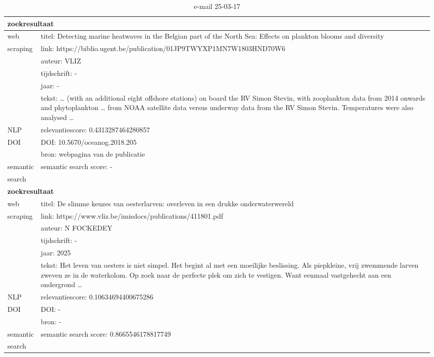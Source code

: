 \begin{table}[h!]
    \caption{e-mail 25-03-17}
    \centering
    \begin{tabularx}{\textwidth}{|p{4cm}|X|} 
        \hline
        \multicolumn{2}{|X|}{\textbf{zoekresultaat}} \\
        \hline
        web &titel: Detecting marine heatwaves in the Belgian part of the North Sea: Effects on plankton blooms and diversity\\
        scraping&link: https://biblio.ugent.be/publication/01JP9TWYXP1MN7W1803HND70W6\\
        &auteur: VLIZ\\
        &tijdschrift: -\\
        &jaar: -\\
        &tekst: … (with an additional eight offshore stations) on board the RV Simon Stevin, with zooplankton data from 2014 onwards and phytoplankton … from NOAA satellite data versus underway data from the RV Simon Stevin. Temperatures were also analysed …\\
        \hline
        NLP&relevantiescore: 0.4313287464280857\\
        \hline
        DOI&DOI: 10.5670/oceanog.2018.205\\
        &bron: webpagina van de publicatie\\
        \hline
        semantic&semantic search score: -\\
        search&\\
        \hline
        \multicolumn{2}{|X|}{\textbf{zoekresultaat}} \\
        \hline
        web &titel: De slimme keuzes van oesterlarven: overleven in een drukke onderwaterwereld\\
        scraping&link: https://www.vliz.be/imisdocs/publications/411801.pdf\\
        &auteur: N FOCKEDEY\\
        &tijdschrift: -\\
        &jaar: 2025\\
        &tekst: Het leven van oesters is niet simpel. Het begint al met een moeilijke beslissing. Als piepkleine, vrij zwemmende larven zweven ze in de waterkolom. Op zoek naar de perfecte plek om zich te vestigen. Want eenmaal vastgehecht aan een ondergrond …\\
        \hline
        NLP&relevantiescore: 0.10634694400675286\\
        \hline
        DOI&DOI: -\\
        &bron: -\\
        \hline
        semantic&semantic search score: 0.8665546178817749\\
        search&\\
        \hline
    \end{tabularx}
    \label{table:email20250317}
\end{table}
